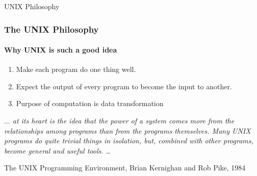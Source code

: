 \documentclass[unknownkeysallowed, 10pt, a4 paper, handout]{beamer}
\begin{document}
\begin{frame}[label=unix]{UNIX Philosophy}
  \frametitle{The UNIX Philosophy}
  \framesubtitle{Why UNIX is such a good idea}
  \begin{enumerate}
    \item Make each program do one thing well. %
    \item Expect the output of every program to become the input to another.
    \item Purpose of computation is data transformation
  \end{enumerate}
  \vfill
  \emph{$\dots$ at its heart is the idea that the power of a system comes
  more from the relationships among programs than from the programs themselves.
  Many UNIX programs do quite trivial things in isolation, but, combined with
  other programs, become general and useful tools. \dots}
  \newline
  \begin{flushright}
  \tiny{The UNIX Programming Environment, Brian Kernighan and Rob Pike, 1984}
  \end{flushright}
\end{frame}
\end{document}
